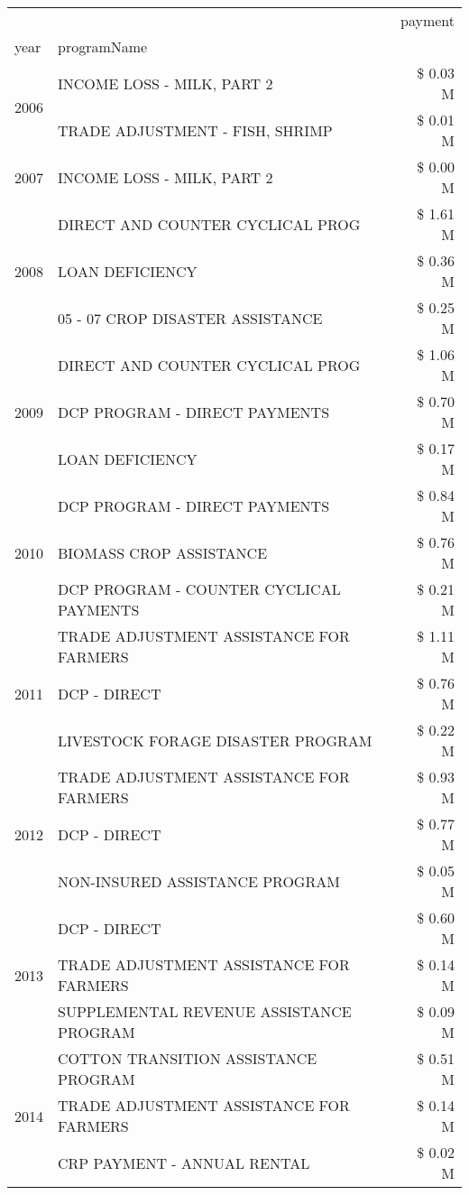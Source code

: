 \begin{tabular}{llr}
\toprule
 &  & payment \\
year & programName &  \\
\midrule
\multirow[t]{2}{*}{2006} & INCOME LOSS - MILK, PART 2 & \$ 0.03 M \\
 & TRADE ADJUSTMENT - FISH, SHRIMP & \$ 0.01 M \\
\cline{1-3}
2007 & INCOME LOSS - MILK, PART 2 & \$ 0.00 M \\
\cline{1-3}
\multirow[t]{3}{*}{2008} & DIRECT AND COUNTER CYCLICAL PROG & \$ 1.61 M \\
 & LOAN DEFICIENCY & \$ 0.36 M \\
 & 05 - 07 CROP DISASTER ASSISTANCE & \$ 0.25 M \\
\cline{1-3}
\multirow[t]{3}{*}{2009} & DIRECT AND COUNTER CYCLICAL PROG & \$ 1.06 M \\
 & DCP PROGRAM - DIRECT PAYMENTS & \$ 0.70 M \\
 & LOAN DEFICIENCY & \$ 0.17 M \\
\cline{1-3}
\multirow[t]{3}{*}{2010} & DCP PROGRAM - DIRECT PAYMENTS & \$ 0.84 M \\
 & BIOMASS CROP ASSISTANCE & \$ 0.76 M \\
 & DCP PROGRAM - COUNTER CYCLICAL PAYMENTS & \$ 0.21 M \\
\cline{1-3}
\multirow[t]{3}{*}{2011} & TRADE ADJUSTMENT ASSISTANCE FOR FARMERS & \$ 1.11 M \\
 & DCP - DIRECT & \$ 0.76 M \\
 & LIVESTOCK FORAGE DISASTER PROGRAM & \$ 0.22 M \\
\cline{1-3}
\multirow[t]{3}{*}{2012} & TRADE ADJUSTMENT ASSISTANCE FOR FARMERS & \$ 0.93 M \\
 & DCP - DIRECT & \$ 0.77 M \\
 & NON-INSURED ASSISTANCE PROGRAM & \$ 0.05 M \\
\cline{1-3}
\multirow[t]{3}{*}{2013} & DCP - DIRECT & \$ 0.60 M \\
 & TRADE ADJUSTMENT ASSISTANCE FOR FARMERS & \$ 0.14 M \\
 & SUPPLEMENTAL REVENUE ASSISTANCE PROGRAM & \$ 0.09 M \\
\cline{1-3}
\multirow[t]{3}{*}{2014} & COTTON TRANSITION ASSISTANCE PROGRAM & \$ 0.51 M \\
 & TRADE ADJUSTMENT ASSISTANCE FOR FARMERS & \$ 0.14 M \\
 & CRP PAYMENT - ANNUAL RENTAL & \$ 0.02 M \\
\cline{1-3}

\end{tabular}
